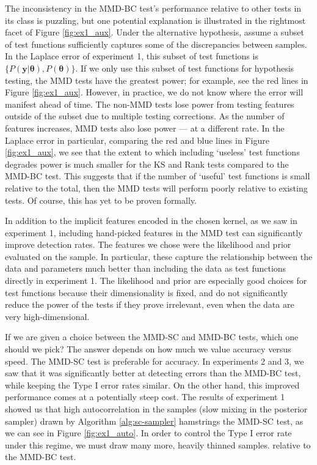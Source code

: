 \documentclass[a4paper,11pt]{article}
\begin{document}
The inconsistency in the MMD-BC test's performance relative to other tests in its class is puzzling, but one potential explanation is illustrated in the rightmost facet of Figure \ref{fig:ex1_aux}. Under the alternative hypothesis, assume a subset of test functions sufficiently captures some of the discrepancies between samples. In the Laplace error of experiment 1, this subset of test functions is $\{P(\mathbf{y}|\mathbf{\theta}), P(\mathbf{\theta})\}$. If we only use this subset of test functions for hypothesis testing, the MMD tests have the greatest power; for example, see the red lines in Figure \ref{fig:ex1_aux}. However, in practice, we do not know where the error will manifest ahead of time. The non-MMD tests lose power from testing features outside of the subset due to multiple testing corrections. As the number of features increases, MMD tests also lose power \cite{reddi_decreasing_2014} --- at a different rate. In the Laplace error in particular, comparing the red and blue lines in Figure \ref{fig:ex1_aux}, we see that the extent to which including `useless' test functions degrades power is much smaller for the KS and Rank tests compared to the MMD-BC test. This suggests that if the number of `useful' test functions is small relative to the total, then the MMD tests will perform poorly relative to existing tests. Of course, this has yet to be proven formally.

In addition to the implicit features encoded in the chosen kernel, as we saw in experiment 1, including hand-picked features in the MMD test can significantly improve detection rates. The features we chose were the likelihood and prior evaluated on the sample. In particular, these capture the relationship between the data and parameters much better than including the data as test functions directly in experiment 1. The likelihood and prior are especially good choices for test functions because their dimensionality is fixed, and do not significantly reduce the power of the tests if they prove irrelevant, even when the data are very high-dimensional.

If we are given a choice between the MMD-SC and MMD-BC tests, which one should we pick? The answer depends on how much we value accuracy versus speed. The MMD-SC test is preferable for accuracy. In experiments 2 and 3, we saw that it was significantly better at detecting errors than the MMD-BC test, while keeping the Type I error rates similar. On the other hand, this improved performance comes at a potentially steep cost. The results of experiment 1 showed us that high autocorrelation in the samples (slow mixing in the posterior sampler) drawn by Algorithm \ref{alg:sc-sampler} hamstrings the MMD-SC test, as we can see in Figure \ref{fig:ex1_auto}. In order to control the Type I error rate under this regime, we must draw many more, heavily thinned samples. relative to the MMD-BC test. 
\end{document}
